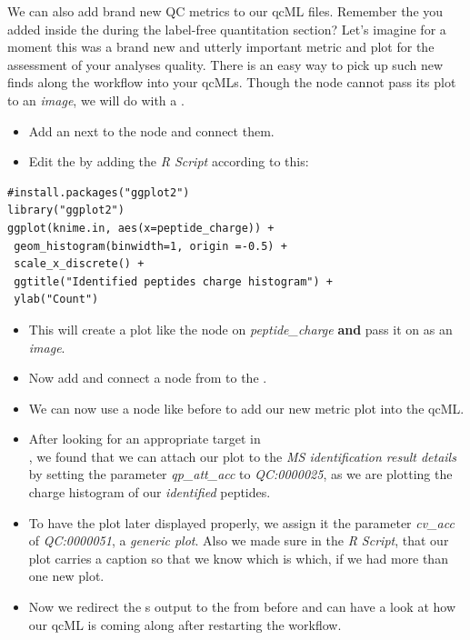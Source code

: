 We can also add brand new QC metrics to our qcML files. Remember the  you added inside the  during the label-free quantitation section? %
 Let's imagine for a moment this was a brand new and utterly important metric and plot for the assessment of your analyses quality. There is an easy way to pick up such new finds along the workflow into your qcMLs. Though the  node cannot pass its plot to an \textit{image}, we will do with a . 

\begin{itemize}
\item Add an  next to the  node and connect them.
\item Edit the  by adding the \textit{R Script} according to this:
\end{itemize}
\begin{lstlisting}
#install.packages("ggplot2")
library("ggplot2")
ggplot(knime.in, aes(x=peptide_charge)) + 
 geom_histogram(binwidth=1, origin =-0.5) + 
 scale_x_discrete() + 
 ggtitle("Identified peptides charge histogram") + 
 ylab("Count")
\end{lstlisting}
\begin{itemize}
\item This will create a plot like the  node on \textit{peptide\_charge} \textbf{and} pass it on as an \textit{image}. 
\item Now add and connect a  node from  to the .
\item We can now use a  node like before to add our new metric plot into the qcML.
\item After looking for an appropriate target in \\ , we found that we can attach our plot to the \textit{MS identification result details} by setting the parameter \textit{qp\_att\_acc} to \textit{QC:0000025}, as we are plotting the charge histogram of our \textit{identified} peptides.
\item To have the plot later displayed properly, we assign it the parameter \textit{cv\_acc} of \textit{QC:0000051}, a \textit{generic plot}. Also we made sure in the \textit{R Script}, that our plot carries a caption so that we know which is which, if we had more than one new plot.
\item Now we redirect the s output to the  from before and can have a look at how our qcML is coming along after restarting the workflow.
\end{itemize}

